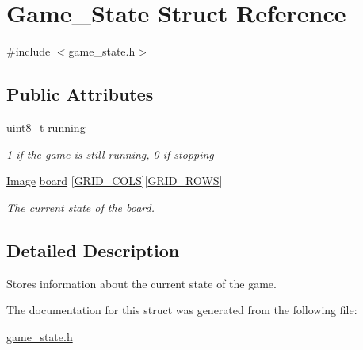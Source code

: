 \hypertarget{structGame__State}{}\section{Game\+\_\+\+State Struct Reference}
\label{structGame__State}


{\ttfamily \#include $<$game\+\_\+state.\+h$>$}

\subsection*{Public Attributes}
\begin{DoxyCompactItemize}
\item 
uint8\+\_\+t \hyperlink{structGame__State_a332734db0872c750d6cad85bf20a9e62}{running}\hypertarget{structGame__State_a332734db0872c750d6cad85bf20a9e62}{}\label{structGame__State_a332734db0872c750d6cad85bf20a9e62}

\begin{DoxyCompactList}\small\item\em 1 if the game is still running, 0 if stopping \end{DoxyCompactList}\item 
\hyperlink{structImage}{Image} \hyperlink{structGame__State_a8f8aaf2c2cee86d71c77f15ece85f9df}{board} \mbox{[}\hyperlink{game__state_8h_a881e2cda79b5951641b07f678f6ef929}{G\+R\+I\+D\+\_\+\+C\+O\+LS}\mbox{]}\mbox{[}\hyperlink{game__state_8h_a5ba0b105774bfdc09ce545d73dcdedd3}{G\+R\+I\+D\+\_\+\+R\+O\+WS}\mbox{]}\hypertarget{structGame__State_a8f8aaf2c2cee86d71c77f15ece85f9df}{}\label{structGame__State_a8f8aaf2c2cee86d71c77f15ece85f9df}

\begin{DoxyCompactList}\small\item\em The current state of the board. \end{DoxyCompactList}\end{DoxyCompactItemize}


\subsection{Detailed Description}
Stores information about the current state of the game. 

The documentation for this struct was generated from the following file\+:\begin{DoxyCompactItemize}
\item 
\hyperlink{game__state_8h}{game\+\_\+state.\+h}\end{DoxyCompactItemize}
